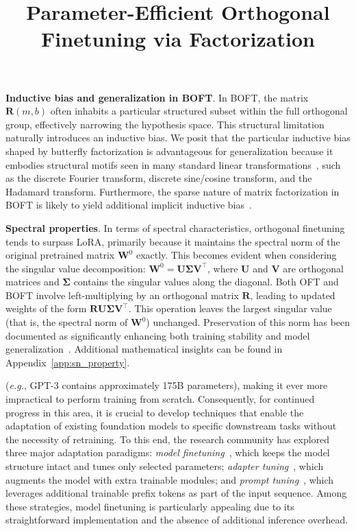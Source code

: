 \title{Parameter-Efficient Orthogonal Finetuning via Factorization}
\textbf{Inductive bias and generalization in BOFT}. In BOFT, the matrix $\bm{R}(m,b)$ often inhabits a particular structured subset within the full orthogonal group, effectively narrowing the hypothesis space. This structural limitation naturally introduces an inductive bias. We posit that the particular inductive bias shaped by butterfly factorization is advantageous for generalization because it embodies structural motifs seen in many standard linear transformations~\cite{dao2019kaleidoscope}, such as the discrete Fourier transform, discrete sine/cosine transform, and the Hadamard transform. Furthermore, the sparse nature of matrix factorization in BOFT is likely to yield additional implicit inductive bias~\cite{gunasekar2017implicit,li2018algorithmic,liu2019neural}.

\textbf{Spectral properties}. In terms of spectral characteristics, orthogonal finetuning tends to surpass LoRA, primarily because it maintains the spectral norm of the original pretrained matrix $\bm{W}^0$ exactly. This becomes evident when considering the singular value decomposition: $\bm{W}^0=\bm{U}\bm{\Sigma}\bm{V}^\top$, where $\bm{U}$ and $\bm{V}$ are orthogonal matrices and $\bm{\Sigma}$ contains the singular values along the diagonal. Both OFT and BOFT involve left-multiplying by an orthogonal matrix $\bm{R}$, leading to updated weights of the form $\bm{R}\bm{U}\bm{\Sigma}\bm{V}^\top$. This operation leaves the largest singular value (that is, the spectral norm of $\bm{W}^0$) unchanged. Preservation of this norm has been documented as significantly enhancing both training stability and model generalization~\cite{miyato2018spectral,yoshida2017spectral}. Additional mathematical insights can be found in Appendix~\ref{app:sn_property}.

(\emph{e.g.}, GPT-3 contains approximately 175B parameters), making it ever more impractical to perform training from scratch. Consequently, for continued progress in this area, it is crucial to develop techniques that enable the adaptation of existing foundation models to specific downstream tasks without the necessity of retraining. To this end, the research community has explored three major adaptation paradigms: \emph{model finetuning}~\cite{hulora2022,zaken2022bitfit,guo2020parameter,raffel2020exploring,qiu2023controlling,zhang2022adaptive,chavan2023one}, which keeps the model structure intact and tunes only selected parameters; \emph{adapter tuning}~\cite{rebuffi2017learning,houlsby2019parameter,pfeiffer2020adapterfusion,lin2020exploring,he2021towards}, which augments the model with extra trainable modules; and \emph{prompt tuning}~\cite{li2021prefix,lester2021power}, which leverages additional trainable prefix tokens as part of the input sequence. Among these strategies, model finetuning is particularly appealing due to its straightforward implementation and the absence of additional inference overhead.

